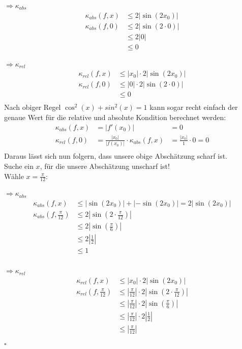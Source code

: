 \documentclass{llncs}
\begin{document}
$\Rightarrow \kappa_{abs}$ 
\begin{align*}
\kappa_{abs}(f,x)&\le  2|\sin(2x_0)|\\  
\kappa_{abs}(f,0)&\le  2|\sin(2\cdot 0)|\\
&\le  2|0|\\
&\le  0
\end{align*}

$\Rightarrow \kappa_{rel}$ 
\begin{align*}
\kappa_{rel}(f,x) &\le  |x_0|\cdot 2|\sin(2x_0)|\\ 
\kappa_{rel}(f,0) &\le  |0|\cdot 2|\sin(2\cdot 0)|\\
 &\le  0\\
\end{align*}
Nach obiger Regel $\cos^2(x)+sin^2(x)=1$ kann sogar recht einfach der genaue Wert für die relative und absolute Kondition berechnet werden:\\
\begin{align*}
\kappa_{abs}(f,x) &= |f'(x_0)| &= 0  \\ 
\kappa_{rel}(f,0) &=\frac{|x_0|}{|f(x_0)|}\cdot\kappa_{abs}(f,x) &=  \frac{|x_0|}{1}\cdot 0 =0\\
\end{align*}
Daraus lässt sich nun folgern, dass unsere obige Abschätzung scharf ist.\\
Suche ein $x$, für die unsere Abschätzung unscharf ist!\\
Wähle $ x=\frac{\pi}{12}$:

$\Rightarrow \kappa_{abs}$ 
\begin{align*}
\kappa_{abs}(f,x)&\le |\sin(2x_0)| + |-\sin(2x_0)| = 2|\sin(2x_0)|\\  
\kappa_{abs}(f,\frac{\pi}{12})&\le  2|\sin(2\cdot \frac{\pi}{12})|\\
&\le  2|\sin( \frac{\pi}{6})|\\
&\le  2|\frac{1}{2}|\\
&\le  1\\
\end{align*}

$\Rightarrow \kappa_{rel}$ 
\begin{align*}
\kappa_{rel}(f,x) &\le  |x_0|\cdot 2|\sin(2x_0)|\\ 
\kappa_{rel}(f,\frac{\pi}{12}) &\le  |\frac{\pi}{12}|\cdot 2|\sin(2\cdot \frac{\pi}{12})|\\
&\le  |\frac{\pi}{12}|\cdot 2|\sin(\frac{\pi}{6})|\\
&\le  |\frac{\pi}{12}|\cdot 2|\frac{1}{2}|\\
&\le  |\frac{\pi}{12}|\\
\end{align*} \hfill $\square$\\
\newpage
\end{document}
